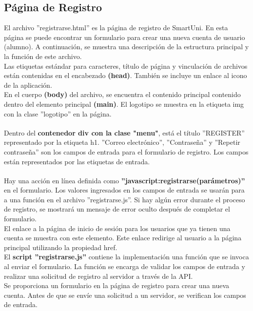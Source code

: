 \documentclass[12pt]{report}
\begin{document}
\subsection{Página de Registro}
El archivo ''registrarse.html'' es la página de registro de SmartUni. En esta página se puede encontrar un formulario para crear una nueva cuenta de usuario (alumno).
A continuación, se muestra una descripción de la estructura principal y la función de este archivo.\\
Las etiquetas estándar para caracteres, título de página y vinculación de archivos están contenidas en el encabezado \textbf{(head)}. También se incluye un enlace al icono de la aplicación. \\
En el cuerpo \textbf{(body)} del archivo, se encuentra el contenido principal contenido dentro del elemento principal \textbf{(main)}.  El logotipo se muestra en la etiqueta img con la clase ''logotipo'' en la página. \\\\
Dentro del \textbf{contenedor div con la clase "menu"}, está el título ''REGISTER'' representado por la etiqueta h1. ''Correo electrónico'', ''Contraseña'' y ''Repetir contraseña'' son los campos de entrada para el formulario de registro. Los campos están representados por las etiquetas de entrada. \\\\
Hay una acción en línea definida como \textbf{''javascript:registrarse(parámetros)''} en el formulario. Los valores ingresados en los campos de entrada se usarán para a una función en el archivo ''registrarse.js''. 
Si hay algún error durante el proceso de registro, se mostrará un mensaje de error oculto después de completar el formulario. 
\\
El enlace a la página de inicio de sesión para los usuarios que ya tienen una cuenta se muestra con este elemento. Este enlace redirige al usuario a la página principal utilizando la propiedad href.
\\
El\textbf{ script ''registrarse.js''} contiene la implementación una función que se invoca al enviar el formulario. La función se encarga de validar los campos de entrada y realizar una solicitud de registro al servidor a través de la API.
\\
Se proporciona un formulario en la página de registro para crear una nueva cuenta. Antes de que se envíe una solicitud a un servidor, se verifican los campos de entrada.
\end{document}
